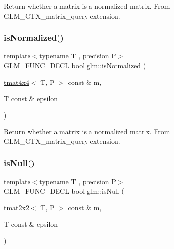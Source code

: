 Return whether a matrix is a normalized matrix. From G\+L\+M\+\_\+\+G\+T\+X\+\_\+matrix\+\_\+query extension. \mbox{\label{group__gtx__matrix__query_ga934b673ec0e16d79eca0ca9dbb5d6d8b}} 
\subsubsection{\texorpdfstring{is\+Normalized()}{isNormalized()}\hspace{0.1cm}{\footnotesize\ttfamily [3/3]}}
{\footnotesize\ttfamily template$<$typename T , precision P$>$ \\
G\+L\+M\+\_\+\+F\+U\+N\+C\+\_\+\+D\+E\+CL bool glm\+::is\+Normalized (\begin{DoxyParamCaption}\item[{\hyperlink{structglm_1_1tmat4x4}{tmat4x4}$<$ T, P $>$ const \&}]{m,  }\item[{T const \&}]{epsilon }\end{DoxyParamCaption})}

Return whether a matrix is a normalized matrix. From G\+L\+M\+\_\+\+G\+T\+X\+\_\+matrix\+\_\+query extension. \mbox{\label{group__gtx__matrix__query_ga37e535cbeaea383b8c1247b98875cd4b}} 
\subsubsection{\texorpdfstring{is\+Null()}{isNull()}\hspace{0.1cm}{\footnotesize\ttfamily [1/3]}}
{\footnotesize\ttfamily template$<$typename T , precision P$>$ \\
G\+L\+M\+\_\+\+F\+U\+N\+C\+\_\+\+D\+E\+CL bool glm\+::is\+Null (\begin{DoxyParamCaption}\item[{\hyperlink{structglm_1_1tmat2x2}{tmat2x2}$<$ T, P $>$ const \&}]{m,  }\item[{T const \&}]{epsilon }\end{DoxyParamCaption})}

